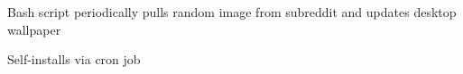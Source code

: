 \documentclass[]{resume}
\begin{document}
\begin{minipage}[t]{0.66\textwidth}
\begin{tightemize}
\item Bash script periodically pulls random image from subreddit and updates desktop wallpaper
\item Self-installs via cron job
\end{tightemize}
\sectionsep


\end{minipage} 


\newpage
{}

\begin{minipage}[t]{0.33\textwidth} 
\section{}
\sectionsep
\end{minipage} 
\end{document}

